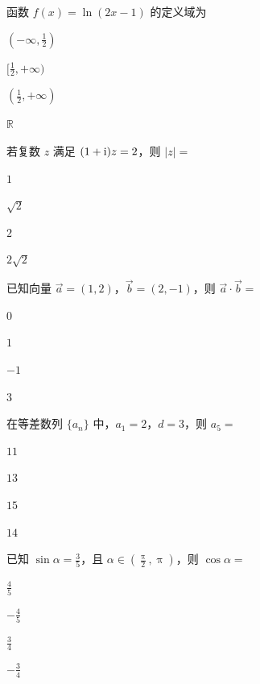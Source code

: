 \documentclass{exam-zh}
\begin{document}
\begin{question}
  函数 $f(x) = \ln(2x - 1)$ 的定义域为\paren[C]
  \begin{choices}
    \item $(-\infty, \frac{1}{2})$
    \item $[\frac{1}{2}, +\infty)$
    \item $(\frac{1}{2}, +\infty)$
    \item $\mathbb{R}$
  \end{choices}
\end{question}

\begin{question}
  若复数 $z$ 满足 $(1 + \mathrm{ i })z = 2$，则 $|z| = $ \paren[B]
  \begin{choices}
    \item $1$
    \item $\sqrt{2}$
    \item $2$
    \item $2\sqrt{2}$
  \end{choices}
\end{question}

\begin{question}
  已知向量 $\vec{a} = (1, 2)$，$\vec{b} = (2, -1)$，则 $\vec{a} \cdot \vec{b} = $ \paren[A]
  \begin{choices}
    \item $0$
    \item $1$
    \item $-1$
    \item $3$
  \end{choices}
\end{question}

\begin{question}
  在等差数列 $\{a_n\}$ 中，$a_1 = 2$，$d = 3$，则 $a_5 = $ \paren[D]
  \begin{choices}
    \item $11$
    \item $13$
    \item $15$
    \item $14$
  \end{choices}
\end{question}

\begin{question}
  已知 $\sin \alpha = \frac{3}{5}$，且 $\alpha \in (\frac{\uppi}{2}, \uppi)$，则 $\cos \alpha = $ \paren[B]
  \begin{choices}
    \item $\frac{4}{5}$
    \item $-\frac{4}{5}$
    \item $\frac{3}{4}$
    \item $-\frac{3}{4}$
  \end{choices}
\end{question}
\end{document}
